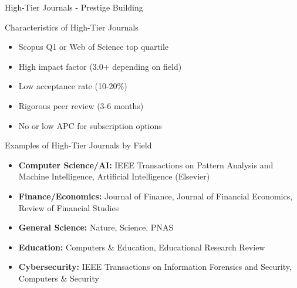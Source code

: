 \documentclass[11pt]{beamer}
\begin{document}
	\begin{frame}{High-Tier Journals - Prestige Building}
		\scriptsize
		\begin{block}{Characteristics of High-Tier Journals}
			\begin{itemize}
				\item Scopus Q1 or Web of Science top quartile
				\item High impact factor (3.0+ depending on field)
				\item Low acceptance rate (10-20\%)
				\item Rigorous peer review (3-6 months)
				\item No or low APC for subscription options
			\end{itemize}
		\end{block}
		\begin{block}{Examples of High-Tier Journals by Field}
			\begin{itemize}
				\item \textbf{Computer Science/AI:} IEEE Transactions on Pattern Analysis and Machine Intelligence, Artificial Intelligence (Elsevier)
				\item \textbf{Finance/Economics:} Journal of Finance, Journal of Financial Economics, Review of Financial Studies
				\item \textbf{General Science:} Nature, Science, PNAS
				\item \textbf{Education:} Computers \& Education, Educational Research Review
				\item \textbf{Cybersecurity:} IEEE Transactions on Information Forensics and Security, Computers \& Security
			\end{itemize}
		\end{block}
	\end{frame}
	
\end{document}
